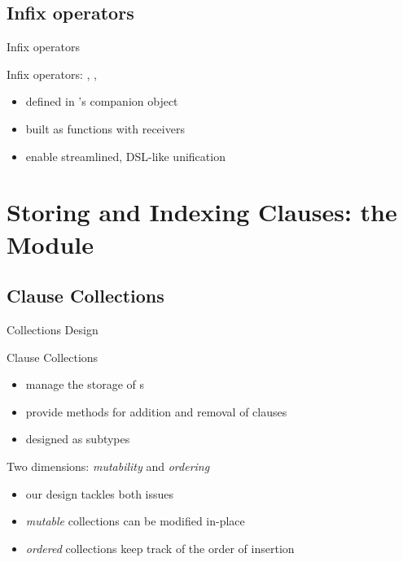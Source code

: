 \documentclass[handout]{beamer}
\begin{document}
\subsection{Infix operators}

\begin{frame}{Infix operators}
    \begin{block}{Infix operators: , , }
        \begin{itemize}
            \item defined in 's companion object
            \item built as functions with receivers
            \item enable streamlined, DSL-like unification
        \end{itemize}
    \end{block}
\end{frame}

\section{Storing and Indexing Clauses: the  Module}

\subsection{Clause Collections}

\begin{frame}[allowframebreaks]{Collections Design}
    \begin{block}{Clause Collections}
        \begin{itemize}
            \item manage the storage of s
            \item provide methods for addition and removal of clauses
            \item designed as  subtypes
        \end{itemize}
    \end{block}
    \begin{block}{Two dimensions: \textit{mutability} and \textit{ordering}}
        \begin{itemize}
            \item our design tackles both issues
            \item \textit{mutable} collections can be modified in-place
            \item \textit{ordered} collections keep track of the order of insertion
        \end{itemize}
    \end{block}
\end{frame}
\end{document}
